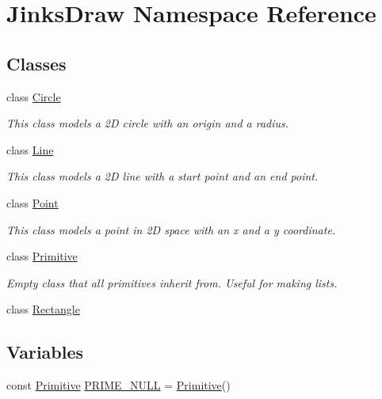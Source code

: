 \hypertarget{namespace_jinks_draw}{}\section{Jinks\+Draw Namespace Reference}
\label{namespace_jinks_draw}
\subsection*{Classes}
\begin{DoxyCompactItemize}
\item 
class \mbox{\hyperlink{class_jinks_draw_1_1_circle}{Circle}}
\begin{DoxyCompactList}\small\item\em This class models a 2D circle with an origin and a radius. \end{DoxyCompactList}\item 
class \mbox{\hyperlink{class_jinks_draw_1_1_line}{Line}}
\begin{DoxyCompactList}\small\item\em This class models a 2D line with a start point and an end point. \end{DoxyCompactList}\item 
class \mbox{\hyperlink{class_jinks_draw_1_1_point}{Point}}
\begin{DoxyCompactList}\small\item\em This class models a point in 2D space with an x and a y coordinate. \end{DoxyCompactList}\item 
class \mbox{\hyperlink{class_jinks_draw_1_1_primitive}{Primitive}}
\begin{DoxyCompactList}\small\item\em Empty class that all primitives inherit from. Useful for making lists. \end{DoxyCompactList}\item 
class \mbox{\hyperlink{class_jinks_draw_1_1_rectangle}{Rectangle}}
\end{DoxyCompactItemize}
\subsection*{Variables}
\begin{DoxyCompactItemize}
\item 
const \mbox{\hyperlink{class_jinks_draw_1_1_primitive}{Primitive}} \mbox{\hyperlink{namespace_jinks_draw_a1d4bdcc49484a3abfad71c82b5c56225}{P\+R\+I\+M\+E\+\_\+\+N\+U\+LL}} = \mbox{\hyperlink{class_jinks_draw_1_1_primitive}{Primitive}}()
\end{DoxyCompactItemize}


